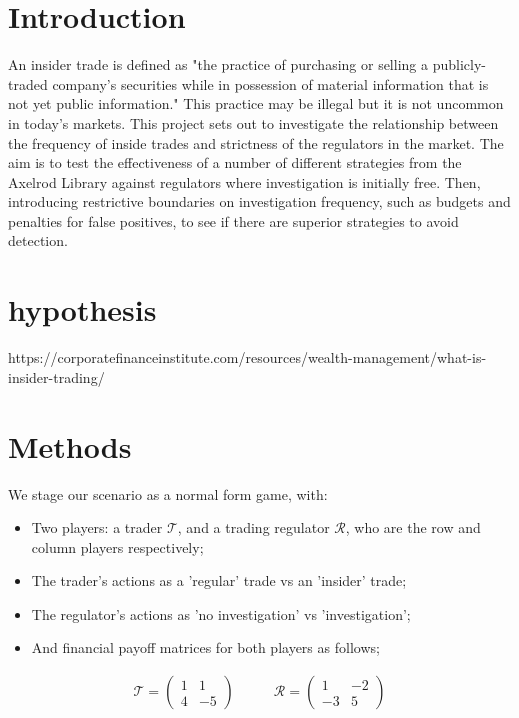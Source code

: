\documentclass{article}
\begin{document}
\section{Introduction}
 An insider trade is defined as "the practice of purchasing or selling a publicly-traded company’s securities while in possession of material information that is not yet public information." This practice may be illegal but it is not uncommon in today's markets. This project sets out to investigate the relationship between the frequency of inside trades and strictness of the regulators in the market. The aim is to test the effectiveness of a number of different strategies from the Axelrod Library against regulators where investigation is initially free. Then, introducing restrictive boundaries on investigation frequency, such as budgets and penalties for false positives, to see if there are superior strategies to avoid detection. 
 \section{hypothesis}
https://corporatefinanceinstitute.com/resources/wealth-management/what-is-insider-trading/

\section{Methods}

We stage our scenario as a normal form game, with:
\begin{itemize}
\item Two players: a trader $\mathcal{T}$, and a trading regulator $\mathcal{R}$, who are the row and column players respectively;
\item The trader's actions as a 'regular' trade vs an 'insider' trade;
\item The regulator's actions as 'no investigation' vs 'investigation';
\item And financial payoff matrices for both players as follows;
\end{itemize}
\begin{equation*}
\begin{split}
    \mathcal{T} = 
    \begin{pmatrix}
    1 & 1 \\
    4 & -5
    \end{pmatrix}
\end{split}
\quad\quad
\begin{split}
    \mathcal{R} = 
    \begin{pmatrix}
    1 & -2 \\
    -3 & 5
    \end{pmatrix}
\end{split}
\end{equation*}
\end{document}
